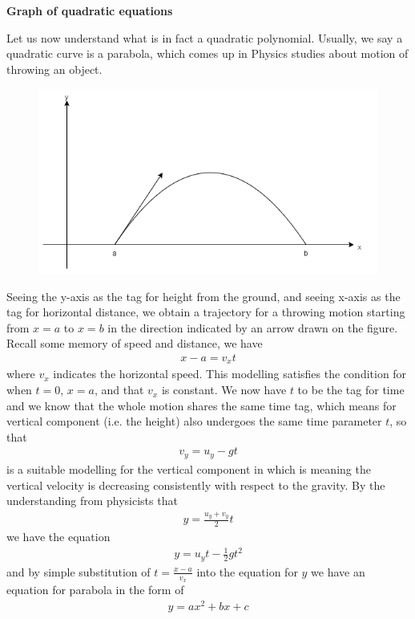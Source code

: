 \documentclass[12pt]{article}
\begin{document}
    \begin{center}
        \textbf{Graph of quadratic equations}
    \end{center}

    Let us now understand what is in fact a quadratic polynomial. Usually, we say a quadratic curve is a parabola, which comes up in Physics studies about motion of throwing an object.

    \begin{figure}[H]
        \centering
        \includegraphics[scale=0.8]{parabola.png}
    \end{figure}

    Seeing the y-axis as the tag for height from the ground, and seeing x-axis as the tag for horizontal distance, we obtain a trajectory for a throwing motion starting from $x=a$ to $x=b$ in the direction indicated by an arrow drawn on the figure. Recall some memory of speed and distance, we have \begin{align*}
        x-a=v_x t
    \end{align*}where $v_x$ indicates the horizontal speed. This modelling satisfies the condition for when $t=0$, $x=a$, and that $v_x$ is constant. We now have $t$ to be the tag for time and we know that the whole motion shares the same time tag, which means for vertical component (i.e. the height) also undergoes the same time parameter $t$, so that \begin{align*}
        v_y=u_y-gt
    \end{align*}
    is a suitable modelling for the vertical component in which is meaning the vertical velocity is decreasing consistently with respect to the gravity. By the understanding from physicists that \begin{align*}
        y=\frac{u_y+v_y}{2}t
    \end{align*} we have the equation \begin{align*}
        y=u_y t-\frac{1}{2}gt^2
    \end{align*} and by simple substitution of $t=\frac{x-a}{v_x}$ into the equation for $y$ we have an equation for parabola in the form of \begin{align*}
        y=ax^2+bx+c
    \end{align*}
\end{document}
